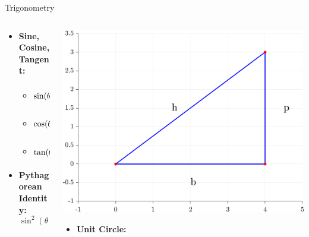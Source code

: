 \documentclass[aspectratio=169,xcolor=dvipsnames,svgnames,x11names,fleqn]{beamer}
\begin{document}
\begin{frame}{Trigonometry}
  \begin{columns}[T]
    \begin{column}{0.5\textwidth}
      \begin{itemize}
        \item \textbf{Sine, Cosine, Tangent:}
          \begin{itemize}
            \item \(\sin(\theta) = \cfrac{\text{p}}{\text{h}}\)
            \item \(\cos(\theta) = \cfrac{\text{b}}{\text{h}}\)
            \item \(\tan(\theta) = \cfrac{\text{p}}{\text{b}}\)
          \end{itemize}
        \item \textbf{Pythagorean Identity:}
          \[
          \sin^2(\theta) + \cos^2(\theta) = 1
          \]
      \end{itemize}
    \end{column}
    \begin{column}{0.5\textwidth}
    \includegraphics[width=0.60\linewidth, trim=2cm 2cm 0 0cm,clip]{figures/pythogoreas.png}
      \begin{itemize}
        \item \textbf{Unit Circle:}
      \end{itemize}
    \end{column}
  \end{columns}
\end{frame}
\end{document}
